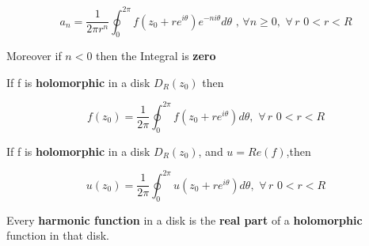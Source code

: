 \documentclass[11pt]{article}
\begin{document}
\[a_{n}=\dfrac{1}{2\pi r^{n}}\oint_{0}^{2\pi}f(z_{0}+re^{i\theta})e^{-ni\theta} d\theta\,\,,\,\forall n\ge 0,\,\, \forall\, r\,\, 0<r<R\]

Moreover if \(n<0\) then the Integral is \textbf{zero}

If f is \textbf{holomorphic} in a disk \(D_{R}(z_{0})\) then

\[f(z_{0})=\dfrac{1}{2\pi}\oint_{0}^{2\pi}f(z_{0}+re^{i\theta})d\theta ,\,\, \forall\, r\,\, 0<r<R\]

If f is \textbf{holomorphic} in a disk \(D_{R}(z_{0})\), and
\(u=Re(f)\),then

\[u(z_{0})=\dfrac{1}{2\pi}\oint_{0}^{2\pi}u(z_{0}+re^{i\theta})d\theta ,\,\, \forall\, r\,\, 0<r<R\]

Every \textbf{harmonic function} in a disk is the \textbf{real part} of
a \textbf{holomorphic} function in that disk.


    
    
    
\end{document}
